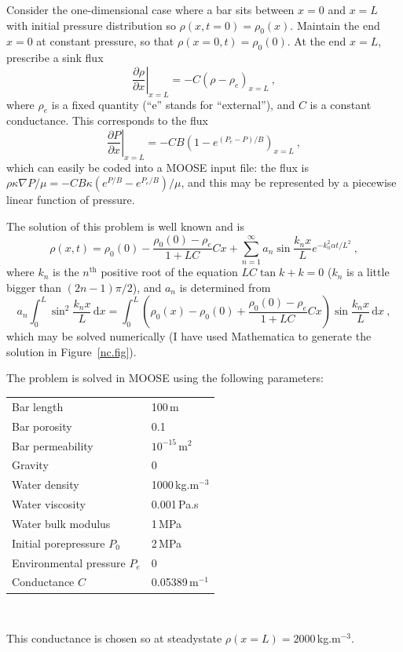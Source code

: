 \documentclass[]{scrreprt}
\begin{document}
Consider the one-dimensional case where a bar sits between $x=0$ and
$x=L$ with initial pressure distribution so $\rho(x,t=0) = \rho_{0}(x)$.
Maintain the end $x=0$ at constant pressure, so that $\rho(x=0, t) =
\rho_{0}(0)$.  At the end $x=L$, prescribe a sink flux
\begin{equation}
\left.\frac{\partial\rho}{\partial x}\right|_{x=L} = -C\left(\rho -
\rho_{e}\right)_{x=L} \ ,
\end{equation}
where $\rho_{e}$ is a fixed quantity (``e'' stands for ``external''),
and $C$ is a constant conductance.  This corresponds to the flux
\begin{equation}
\left.\frac{\partial P}{\partial x}\right|_{x=L} = -CB\left(1 -
e^{(P_{e}-P)/B}\right)_{x=L} \ ,
\end{equation}
which can easily be coded into a MOOSE input file: the flux is
$\rho\kappa\nabla P/\mu = -CB\kappa(e^{P/B} - e^{P_{e}/B})/\mu$, and
this may be represented by a piecewise linear function of pressure.

The solution of this problem is well known and is
\begin{equation}
\rho(x, t) = \rho_{0}(0) - \frac{\rho_{0}(0) - \rho_{e}}{1 + LC}Cx +
\sum_{n=1}^{\infty} a_{n}\sin \frac{k_{n}x}{L}e^{-k_{n}^{2}\alpha
  t/L^{2}} \ ,
\end{equation}
where $k_{n}$ is the $n^{\mathrm{th}}$ positive root of the equation
$LC\tan k + k=0$  ($k_{n}$ is a little bigger than
$(2n-1)\pi/2$), and $a_{n}$ is determined from
\begin{equation}
a_{n}\int_{0}^{L}\sin^{2}\frac{k_{n}x}{L}\,\mathrm{d}x =
\int_{0}^{L}\left(\rho_{0}(x) - \rho_{0}(0) + \frac{\rho_{0}(0) -
  \rho_{e}}{1 + LC}Cx\right)\sin \frac{k_{n}x}{L}\,\mathrm{d}x \ ,
\end{equation}
which may be solved numerically (I have used Mathematica to generate
the solution in Figure~\ref{nc.fig}).

\noindent The problem is solved in MOOSE using the following parameters:
\begin{center}
\begin{tabular}{|ll|}
\hline
Bar length & 100\,m \\
Bar porosity & 0.1 \\
Bar permeability & $10^{-15}$\,m$^{2}$ \\
\hline
Gravity & 0 \\
\hline
Water density & 1000\,kg.m$^{-3}$ \\
Water viscosity & 0.001\,Pa.s \\
Water bulk modulus & 1\,MPa \\
\hline
Initial porepressure $P_{0}$ & 2\,MPa \\
Environmental pressure $P_{e}$ & 0 \\
\hline
Conductance $C$ & 0.05389\,m$^{-1}$ \\
\hline
\end{tabular} \\
\end{center}
This conductance is chosen so at steadystate $\rho(x=L)=2000$\,kg.m$^{-3}$.
\end{document}
